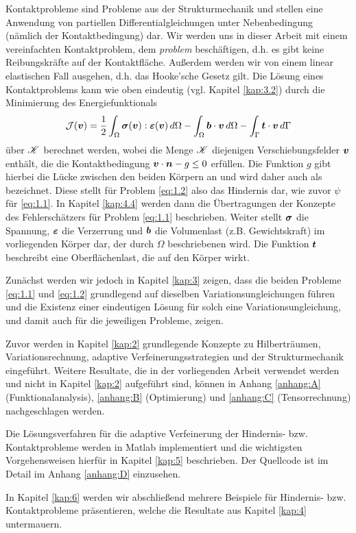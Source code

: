 Kontaktprobleme sind Probleme aus der Strukturmechanik und stellen eine Anwendung von partiellen Differentialgleichungen unter Nebenbedingung (nämlich der Kontaktbedingung) dar. Wir werden uns in dieser Arbeit mit einem vereinfachten Kontaktproblem, dem \textit{problem} beschäftigen, d.h. es gibt keine Reibungskräfte auf der Kontaktfläche. Außerdem werden wir von einem linear elastischen Fall ausgehen, d.h. das Hooke'sche Gesetz gilt. Die Lösung eines Kontaktproblems kann wie oben eindeutig (vgl. Kapitel \ref{kap:3.2}) durch die Minimierung des Energiefunktionals
\begin{align}\label{eq:1.2}
	\mathcal J (\boldsymbol v) = \frac 12 \int_\Omega \boldsymbol \sigma (\boldsymbol v):\boldsymbol {\varepsilon}(\boldsymbol v) \, d\Omega - \int_\Omega \boldsymbol b\cdot \boldsymbol v \, d\Omega - \int_{\Gamma} \boldsymbol t\cdot \boldsymbol v \, d\Gamma 
\end{align}
über $\mathscr K$ berechnet werden, wobei die Menge $\mathscr K$ diejenigen Verschiebungsfelder $\boldsymbol v$ enthält, die die Kontaktbedingung $\boldsymbol v \cdot\boldsymbol n - g \le 0$ erfüllen. Die Funktion $g$ gibt hierbei die Lücke zwischen den beiden Körpern an und wird daher auch als \textit{} bezeichnet. Diese  stellt für Problem \eqref{eq:1.2} also das Hindernis dar, wie zuvor $\psi$ für \eqref{eq:1.1}. In Kapitel \ref{kap:4.4} werden dann die Übertragungen der Konzepte des Fehlerschätzers für Problem \eqref{eq:1.1} beschrieben. Weiter stellt $\boldsymbol \sigma$ die Spannung, $\boldsymbol {\varepsilon}$ die Verzerrung und $\boldsymbol b$ die Volumenlast (z.B. Gewichtskraft) im vorliegenden Körper dar, der durch $\Omega$ beschriebenen wird. Die Funktion $\boldsymbol t$ beschreibt eine Oberflächenlast, die auf den Körper wirkt.

Zunächst werden wir jedoch in Kapitel \ref{kap:3} zeigen, dass die beiden Probleme \eqref{eq:1.1} und \eqref{eq:1.2} grundlegend auf dieselben Variationsungleichungen führen und die Existenz einer eindeutigen Lösung für solch eine Variationsungleichung, und damit auch für die jeweiligen Probleme, zeigen.

Zuvor werden in Kapitel \ref{kap:2}  grundlegende Konzepte zu Hilberträumen, Variationsrechnung, adaptive Verfeinerungsstrategien und der Strukturmechanik eingeführt. Weitere Resultate, die in der vorliegenden Arbeit verwendet werden und nicht in Kapitel \ref{kap:2} aufgeführt sind, können in Anhang \ref{anhang:A} (Funktionalanalysis), \ref{anhang:B} (Optimierung) und \ref{anhang:C} (Tensorrechnung) nachgeschlagen werden.

Die Lösungsverfahren für die adaptive Verfeinerung der Hindernis- bzw. Kontaktprobleme werden in Matlab implementiert und die wichtigsten Vorgehensweisen hierfür in Kapitel \ref{kap:5} beschrieben. Der Quellcode ist im Detail im Anhang \ref{anhang:D} einzusehen.

In Kapitel \ref{kap:6} werden wir abschließend mehrere Beispiele für Hindernis- bzw. Kontaktprobleme präsentieren, welche die Resultate aus Kapitel \ref{kap:4} untermauern.



\newpage

